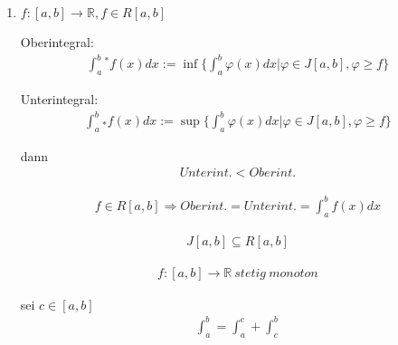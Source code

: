 \begin{enumerate}

\item[]

$f:[a,b]\rightarrow\mathbb{R},f\in R[a,b]$

Oberintegral:
\begin{align*}
\int_a^b {}^* f(x)dx:=\inf\{\int_a^b\varphi(x)dx|\varphi\in J[a,b],\varphi\geq f\}
\end{align*}

Unterintegral:
\begin{align*}
\int_a^b {}_* f(x)dx:=\sup\{\int_a^b\varphi(x)dx|\varphi\in J[a,b],\varphi\geq f\}
\end{align*}

dann
\begin{align*}
Unterint.<Oberint.
\end{align*}

\begin{align*}
f\in R[a,b]\Rightarrow Oberint.=Unterint.=\int_a^b f(x)dx
\end{align*}

\begin{align*}
J[a,b]\subseteq R[a,b]
\end{align*}

\begin{align*}
f:[a,b]\rightarrow\mathbb{R}\ stetig\ monoton
\end{align*}

sei $c\in[a,b]$
\begin{align*}
\int_a^b=\int_a^c+\int_c^b
\end{align*}

\end{enumerate}